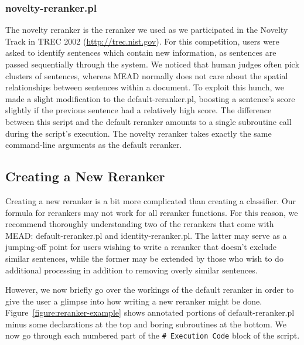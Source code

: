 \documentclass[10pt]{article}
\begin{document}
\subsubsection{novelty-reranker.pl}

The novelty reranker is the reranker we used as we participated in the
Novelty Track in TREC 2002 (\url{http://trec.nist.gov}).  For this
competition, users were asked to identify sentences which contain new
information, as sentences are passed sequentially through the system.
We noticed that human judges often pick clusters of sentences, whereas
MEAD normally does not care about the spatial relationships between
sentences within a document.  To exploit this hunch, we made a slight
modification to the default-reranker.pl, boosting a sentence's score
slightly if the previous sentence had a relatively high score.  The
difference between this script and the default reranker amounts to a
single subroutine call during the script's execution.  The novelty
reranker takes exactly the same command-line arguments as the default
reranker.

\subsection{Creating a New Reranker}

Creating a new reranker is a bit more complicated than
creating a classifier.  Our formula for rerankers may
not work for all reranker functions.  For this reason,
we recommend thoroughly understanding two of the rerankers
that come with MEAD: default-reranker.pl and 
identity-reranker.pl.  The latter may serve as a jumping-off
point for users wishing to write a reranker that doesn't
exclude similar sentences, while the former may be extended
by those who wish to do additional processing in addition
to removing overly similar sentences.

However, we now 
briefly go over the workings of the default reranker in 
order to give the user a glimpse into how writing a new
reranker might be done.  Figure~\ref{figure:reranker-example}
shows annotated portions of default-reranker.pl minus some
declarations at the top and boring subroutines at the bottom.
We now go through each numbered part of the 
\verb|# Execution Code| block of the script.
\end{document}
